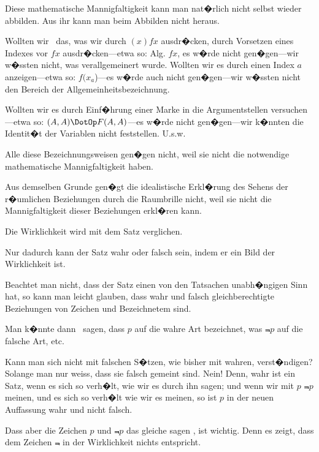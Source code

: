 \begin{propositions}
{Diese mathematische Mannigfaltigkeit kann
man nat�rlich nicht selbst wieder abbilden. Aus
ihr kann man beim Abbilden nicht heraus.}


{Wollten wir \zumBeispiel\ das, was wir durch \glqq{}$(x) fx$\grqq{}
ausdr�cken, durch Vorsetzen eines Indexes vor
\glqq{}$fx$\grqq{} ausdr�cken---etwa so: \glqq{}Alg. $fx$\grqq{}, es w�rde
nicht gen�gen---wir w�ssten nicht, was verallgemeinert
wurde. Wollten wir es durch einen
Index \glqq{}$a$\grqq{} anzeigen---etwa so: \glqq{}$f(x_{a}$)\grqq{}---es w�rde
auch nicht gen�gen---wir w�ssten nicht den
Bereich der Allgemeinheitsbezeichnung.

Wollten wir es durch Einf�hrung einer Marke
in die Argumentstellen ver\-su\-chen---etwa so:
\glqq{}$(A, A) \DotOp F (A, A)$\grqq{}---es w�rde nicht ge\-n�\-gen---wir
k�nnten die Identit�t der Variablen nicht feststellen.
U.s.w.

Alle diese Bezeichnungsweisen gen�gen nicht,
weil sie nicht die notwendige mathematische
Mannigfaltigkeit haben.}


{{\stretchyspace
Aus demselben Grunde gen�gt die idealistische
Erkl�rung des Sehens der r�umlichen Beziehungen
durch die \glqq{}Raumbrille\grqq{} nicht, weil sie nicht die
Mannigfaltigkeit dieser Beziehungen erkl�ren kann.}}


{Die Wirklichkeit wird mit dem Satz verglichen.}


{Nur dadurch kann der Satz wahr oder falsch
sein, indem er ein Bild der Wirklichkeit ist.}


{Beachtet man nicht, dass der Satz einen von
den Tatsachen unabh�ngigen Sinn hat, so kann
man leicht glauben, dass wahr und falsch gleichberechtigte
Beziehungen von Zeichen und Bezeichnetem
sind.

Man k�nnte dann \zumBeispiel\ sagen, dass \glqq{}$p$\grqq{} auf die
wahre Art bezeichnet, was \glqq{}$\Not{p}$\grqq{} auf die falsche
Art, etc.}


{Kann man sich nicht mit falschen S�tzen, wie
bisher mit wahren, verst�ndigen? Solange man
nur weiss, dass sie falsch gemeint sind. Nein!
Denn, wahr ist ein Satz, wenn es sich so verh�lt,
wie wir es durch ihn sagen; und wenn wir mit
\glqq{}$p$\grqq{} $\Not{p}$ meinen, und es sich so verh�lt wie wir es
meinen, so ist \glqq{}$p$\grqq{} in der neuen Auffassung wahr
und nicht falsch.}


{Dass aber die Zeichen \glqq{}$p$\grqq{} und \glqq{}$\Not{p}$\grqq{} das gleiche
sagen , ist wichtig. Denn es zeigt, dass
dem Zeichen \glqq{}$\Not{}$\grqq{} in der Wirklichkeit nichts
entspricht.

}
\end{propositions}

